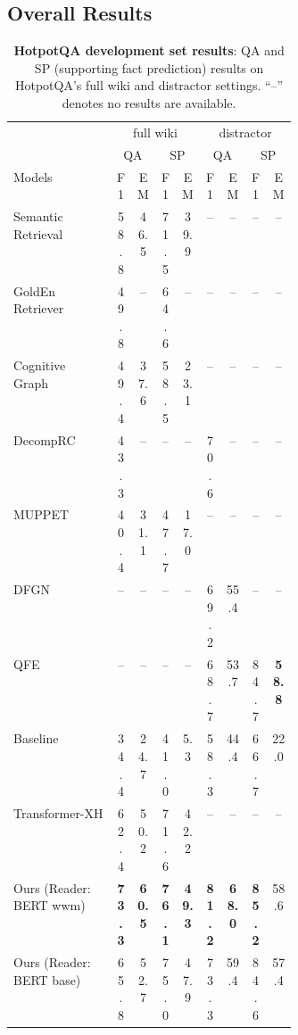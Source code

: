 \subsection{Overall Results}
\label{sec:overall_results}
\begin{table}[!tb]
    \centering
    \small{
\begin{tabular}{ p{0.37\linewidth} | c c |cc|cc | cc}\toprule 

 & \multicolumn{4}{c}{full wiki}  & \multicolumn{4}{c}{distractor}\\
& \multicolumn{2}{c}{QA}  & \multicolumn{2}{c}{SP}&\multicolumn{2}{c}{QA}  & \multicolumn{2}{c}{SP}\\
 Models  & F1 & EM  & F1 & EM & F1 & EM & F1 & EM \\
    \midrule

Semantic Retrieval \citep{nie_pip_2019} & 58.8 & 46.5 &71.5 &39.9 &-- &  -- &-- & --\\  
GoldEn Retriever~\citep{qi2019answering} & 49.8& -- &64.6 & -- &-- &  -- &-- & --\\  
Cognitive Graph \citep{cognitive_graph_2019} & 49.4 & 37.6 & 58.5& 23.1 & -- & -- &-- &-- \\
DecompRC \citep{min2019multi} & 43.3 & -- &  -- & -- &  70.6 & --　&  -- & --　\\
MUPPET \citep{muppet2019multihop} & 40.4 & 31.1 &47.7 & 17.0 & -- & -- & -- &-- \\
DFGN \citep{dynamic_multihop} & -- & -- & -- & -- &69.2 &  55.4 & --& -- \\ 
QFE \citep{nishida2019qfe} & -- & -- & -- & -- &68.7& 53.7 & 84.7 & \bf 58.8 \\ 
Baseline \citep{yang-etal-2018-hotpotqa} & 34.4 & 24.7& 41.0 &5.3 & 58.3 & 44.4 & 66.7 &  22.0\\  \hdashline
Transformer-XH \citep{zhao2020transformerxh}&  62.4 & 50.2 & 71.6 &42.2 & -- & -- & -- & -- \\  \hline
Ours (Reader: BERT wwm) & \bf 73.3 & \bf 60.5  & \bf 76.1 & \bf 49.3 & \bf 81.2 &  \bf 68.0 & \bf 85.2 & 58.6 \\
Ours (Reader: BERT base) &  65.8 & 52.7 & 75.0  & 47.9  & 73.3  & 59.4  & 84.6 & 57.4  \\
\bottomrule
\end{tabular}
    \caption{{\bf HotpotQA development set results}: QA and SP (supporting fact prediction) results on HotpotQA's full wiki and distractor settings. ``--'' denotes no results are available.
    }
    \label{table:dev_results_hotpot_qa}
    }
\end{table} 

